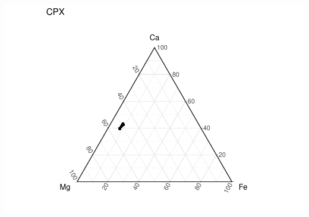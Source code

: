 \documentclass[
]{article}
\begin{document}
\includegraphics{KBH_94_23_DE_5_all_pyx_lines_files/figure-latex/unnamed-chunk-8-1.pdf}
\end{document}

